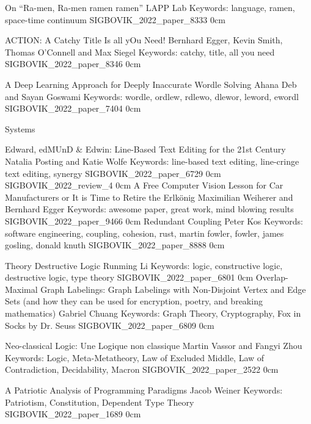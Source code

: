 \addpaper
    {On ``Ra-men, Ra-men ramen ramen''}
    {LAPP Lab}
    {Keywords: language, ramen, space-time continuum}
    {SIGBOVIK_2022_paper_8333}
    {0cm}
    {}


\addpaper
    {ACTION: A Catchy Title Is all yOu Need!}
    {Bernhard Egger, Kevin Smith, Thomas O'Connell and Max Siegel}
    {Keywords: catchy, title, all you need}
    {SIGBOVIK_2022_paper_8346}
    {0cm}
    {}


\addpaper
    {A Deep Learning Approach for Deeply Inaccurate Wordle Solving}
    {Ahana Deb and Sayan Goswami}
    {Keywords: wordle, ordlew, rdlewo, dlewor, leword, ewordl}
    {SIGBOVIK_2022_paper_7404}
    {0cm}
    {}


\addtrack
    {}{Systems}

\addpaper
    {Edward, edMUnD \& Edwin: Line-Based Text Editing for the 21st Century}
    {Natalia Posting and Katie Wolfe}
    {Keywords: line-based text editing, line-cringe text editing, synergy}
    {SIGBOVIK_2022_paper_6729}
    {0cm}
    {}
\addreview
    {SIGBOVIK_2022_review_4}
    {0cm}
\addpaper
    {A Free Computer Vision Lesson for Car Manufacturers or It is Time to Retire the Erlkönig}
    {Maximilian Weiherer and Bernhard Egger}
    {Keywords: awesome paper, great work, mind blowing results}
    {SIGBOVIK_2022_paper_9466}
    {0cm}
    {}
\addpaper
    {Redundant Coupling}
    {Peter Kos}
    {Keywords: software engineering, coupling, cohesion, rust, martin fowler, fowler, james gosling, donald knuth}
    {SIGBOVIK_2022_paper_8888}
    {0cm}
    {}


\addtrack
    {}{Theory}
\addpaper
    {Destructive Logic}
    {Runming Li}
    {Keywords: logic, constructive logic, destructive logic, type theory}
    {SIGBOVIK_2022_paper_6801}
    {0cm}
    {}
\addpaper
    {Overlap-Maximal Graph Labelings: Graph Labelings with Non-Disjoint Vertex and Edge Sets (and how they can be used for encryption, poetry, and breaking mathematics)}
    {Gabriel Chuang}
    {Keywords: Graph Theory, Cryptography, Fox in Socks by Dr. Seuss}
    {SIGBOVIK_2022_paper_6809}
    {0cm}
    {}


\addpaper
    {Neo-classical Logic: Une Logique non classique}
    {Martin Vassor and Fangyi Zhou}
    {Keywords: Logic, Meta-Metatheory, Law of Excluded Middle, Law of Contradiction, Decidability, Macron}
    {SIGBOVIK_2022_paper_2522}
    {0cm}
    {}


\addpaper
    {A Patriotic Analysis of Programming Paradigms}
    {Jacob Weiner}
    {Keywords: Patriotism, Constitution, Dependent Type Theory}
    {SIGBOVIK_2022_paper_1689}
    {0cm}
    {}



